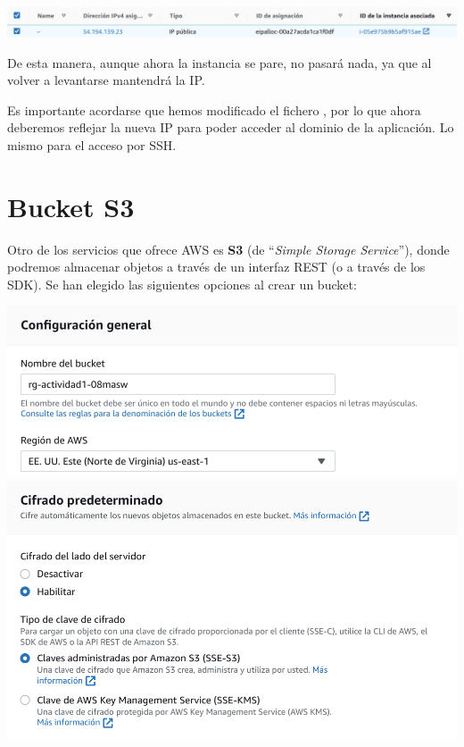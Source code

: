 \documentclass{\ClassPath/viu-tfm-template}
\begin{document}
\begin{center}
    \includegraphics[frame,width=\linewidth]{img/ip_elastica.png}
\end{center}

De esta manera, aunque ahora la instancia se pare, no pasará nada, ya que al volver a levantarse mantendrá la IP.

Es importante acordarse que hemos modificado el fichero , por lo que ahora deberemos reflejar la nueva IP para poder acceder al dominio de la aplicación. Lo mismo para el acceso por SSH.


\chapter{Bucket S3}

Otro de los servicios que ofrece AWS es \textbf{S3} (de “\textit{Simple Storage Service}”), donde podremos almacenar objetos a través de un interfaz REST (o a través de los SDK). Se han elegido las siguientes opciones al crear un bucket:


\begin{center}
    \includegraphics[width=0.8\linewidth]{img/s31.png}
    \includegraphics[width=0.8\linewidth]{img/s33.png}
\end{center}
\end{document}
